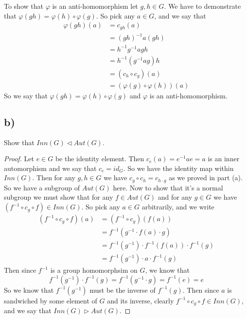 \documentclass{article}
\theoremstyle{definition}
\begin{document}
        To show that $\varphi$ is an anti-homomorphism let $g,h \in G$. We have to demonstrate that $\varphi(gh)= \varphi(h) \circ \varphi(g)$.
        So pick any $a \in G$, and we say that
        \begin{align*}
            \varphi(gh)(a) &= c_{gh}(a)\\
            &=(gh)^{-1}a(gh)\\
            &=h^{-1}g^{-1}agh \\
            &=h^{-1}(g^{-1}ag)h\\
            &=(c_h \circ c_g)(a)\\
            &=(\varphi(g)\circ\varphi(h))(a)
        \end{align*}
        So we say that $\varphi(gh) = \varphi(h)\circ\varphi(g)$ and $\varphi$ is an anti-homomorphism.
    \subsection*{b)}
        \begin{mdframed}
            Show that $Inn(G) \triangleleft Aut(G)$.
        \end{mdframed}
        \begin{proof}
            Let $e\in G$ be the identity element. Then $c_e(a) = e^{-1}ae = a$ is an inner automorphism and 
            we say that $c_e = id_G$. So we have the identity map within $Inn(G)$.
            Then for any $g,h\in G$ we have $c_g \circ c_h = c_{h \cdot g}$ as we proved in part (a).
            So we have a subgroup of $Aut(G)$ here. Now to show that it's a normal subgroup we must show that for 
            any $f \in Aut(G)$ and for any $g \in G$ we have $(f^{-1} \circ c_g \circ f) \in Inn(G)$. 
            So pick any $a \in G$ arbitrarily, and we write 
            \begin{align*}
                (f^{-1} \circ c_g \circ f)(a) &= (f^{-1} \circ c_g)(f(a)) \\
                &=f^{-1}(g^{-1} \cdot f(a) \cdot g) \\
                &=f^{-1}(g^{-1}) \cdot f^{-1}(f(a)) \cdot f^{-1}(g) \\
                &=f^{-1}(g^{-1}) \cdot a \cdot f^{-1}(g)
            \end{align*}
            Then since $f^{-1}$ is a group homomorphsim on $G$, we know that 
            \[
                f^{-1}(g^{-1}) \cdot f^{-1}(g) = f^{-1}(g^{-1} \cdot g) = f^{-1}(e) = e
            \]
            So we know that $f^{-1}(g^{-1})$ must be the inverse of $f^{-1}(g)$. Then since $a$ is sandwiched 
            by some element of $G$ and its inverse, clearly $f^{-1} \circ c_g \circ f \in Inn(G)$, and we say that 
            $Inn(G) \triangleright Aut(G)$.
        \end{proof}
\end{document}
